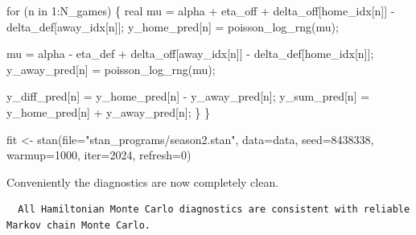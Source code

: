 \documentclass[
  letterpaper,
  DIV=11,
  numbers=noendperiod]{scrartcl}
\newenvironment{Shaded}{\begin{snugshade}}{\end{snugshade}}
\newcommand{\AttributeTok}[1]{\textcolor[rgb]{0.40,0.45,0.13}{#1}}
\newcommand{\ControlFlowTok}[1]{\textcolor[rgb]{0.00,0.23,0.31}{#1}}
\newcommand{\DataTypeTok}[1]{\textcolor[rgb]{0.68,0.00,0.00}{#1}}
\newcommand{\DecValTok}[1]{\textcolor[rgb]{0.68,0.00,0.00}{#1}}
\newcommand{\FunctionTok}[1]{\textcolor[rgb]{0.28,0.35,0.67}{#1}}
\newcommand{\NormalTok}[1]{\textcolor[rgb]{0.00,0.23,0.31}{#1}}
\newcommand{\OtherTok}[1]{\textcolor[rgb]{0.00,0.23,0.31}{#1}}
\newcommand{\SpecialCharTok}[1]{\textcolor[rgb]{0.37,0.37,0.37}{#1}}
\newcommand{\StringTok}[1]{\textcolor[rgb]{0.13,0.47,0.30}{#1}}
\begin{document}
\begin{codelisting}
\begin{Shaded}
\begin{Highlighting}[]
  \ControlFlowTok{for}\NormalTok{ (n }\ControlFlowTok{in} \DecValTok{1}\NormalTok{:N\_games) \{}
    \DataTypeTok{real}\NormalTok{ mu =  alpha + eta\_off}
\NormalTok{             + delta\_off[home\_idx[n]]}
\NormalTok{             {-} delta\_def[away\_idx[n]];}
\NormalTok{    y\_home\_pred[n] = poisson\_log\_rng(mu);}

\NormalTok{    mu =  alpha {-} eta\_def}
\NormalTok{        + delta\_off[away\_idx[n]]}
\NormalTok{        {-} delta\_def[home\_idx[n]];}
\NormalTok{    y\_away\_pred[n] = poisson\_log\_rng(mu);}

\NormalTok{    y\_diff\_pred[n] = y\_home\_pred[n] {-} y\_away\_pred[n];}
\NormalTok{    y\_sum\_pred[n] = y\_home\_pred[n] + y\_away\_pred[n];}
\NormalTok{  \}}
\NormalTok{\}}
\end{Highlighting}
\end{Shaded}

\end{codelisting}

\begin{Shaded}
\begin{Highlighting}[]
\NormalTok{fit }\OtherTok{\textless{}{-}} \FunctionTok{stan}\NormalTok{(}\AttributeTok{file=}\StringTok{"stan\_programs/season2.stan"}\NormalTok{,}
            \AttributeTok{data=}\NormalTok{data, }\AttributeTok{seed=}\DecValTok{8438338}\NormalTok{,}
            \AttributeTok{warmup=}\DecValTok{1000}\NormalTok{, }\AttributeTok{iter=}\DecValTok{2024}\NormalTok{, }\AttributeTok{refresh=}\DecValTok{0}\NormalTok{)}
\end{Highlighting}
\end{Shaded}

Conveniently the diagnostics are now completely clean.

\begin{Shaded}
\end{Shaded}

\begin{verbatim}
  All Hamiltonian Monte Carlo diagnostics are consistent with reliable
Markov chain Monte Carlo.
\end{verbatim}
\end{document}
